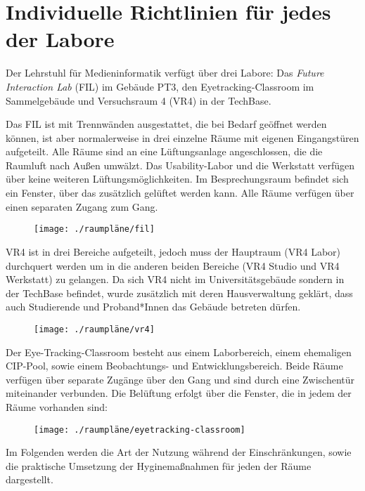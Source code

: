 \section{Individuelle Richtlinien für jedes der Labore}

Der Lehrstuhl für Medieninformatik verfügt über drei Labore: Das \emph{Future Interaction Lab} (FIL) im Gebäude PT3, den Eyetracking-Classroom im Sammelgebäude und Versuchsraum 4 (VR4) in der TechBase.

\medskip
\noindent
Das FIL ist mit Trennwänden ausgestattet, die bei Bedarf geöffnet werden können, ist aber normalerweise in drei einzelne Räume mit eigenen Eingangstüren aufgeteilt.
Alle Räume sind an eine Lüftungsanlage angeschlossen, die die Raumluft nach Außen umwälzt.
Das Usability-Labor und die Werkstatt verfügen über keine weiteren Lüftungsmöglichkeiten.
Im Besprechungsraum befindet sich ein Fenster, über das zusätzlich gelüftet werden kann.
Alle Räume verfügen über einen separaten Zugang zum Gang. 

\medskip
\begin{figure}[h!]
\centering
\texttt{[image: ./raumpläne/fil]}
\end{figure}

\medskip
\noindent
VR4 ist in drei Bereiche aufgeteilt, jedoch muss der Hauptraum (VR4 Labor) durchquert werden um in die anderen beiden Bereiche (VR4 Studio und VR4 Werkstatt) zu gelangen.
Da sich VR4 nicht im Universitätsgebäude sondern in der TechBase befindet, wurde zusätzlich mit deren Hausverwaltung geklärt, dass auch Studierende und Proband*Innen das Gebäude betreten dürfen.

\medskip
\begin{figure}[h!]
\centering
\texttt{[image: ./raumpläne/vr4]}
\end{figure}

\medskip
\noindent
Der Eye-Tracking-Classroom besteht aus einem Laborbereich, einem ehemaligen CIP-Pool, sowie einem Beobachtungs- und Entwicklungsbereich.
Beide Räume verfügen über separate Zugänge über den Gang und sind durch eine Zwischentür miteinander verbunden.
Die Belüftung erfolgt über die Fenster, die in jedem der Räume vorhanden sind:

\medskip
\begin{figure}[h!]
\centering
\texttt{[image: ./raumpläne/eyetracking-classroom]}
\end{figure}

\medskip
\noindent
Im Folgenden werden die Art der Nutzung während der Einschränkungen, sowie die praktische Umsetzung der Hyginemaßnahmen für jeden der Räume dargestellt.

